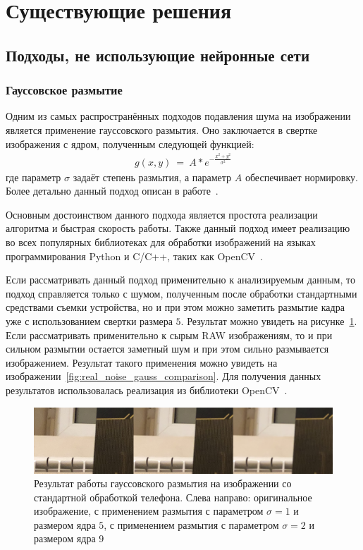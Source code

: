 \documentclass[14pt]{mmcs_article}
\begin{document}
\section{Существующие решения}
\subsection{Подходы, не использующие нейронные сети}

\subsubsection{Гауссовское размытие}
Одним из самых распространённых подходов подавления шума на изображении является применение гауссовского размытия. Оно заключается в свертке изображения с ядром, полученным следующей функцией:
\begin{eqnarray}\label{eq:gauss_kernel_function}
g(x, y)\ =\ A \ast e^{-\frac{x^2 + y^2}{\sigma^2}}
\end{eqnarray}
где параметр $\sigma$ задаёт степень размытия, а параметр $A$ обеспечивает нормировку. Более детально данный подход описан в работе~\autocite{GaussianBilinear}.

Основным достоинством данного подхода является простота реализации алгоритма и быстрая скорость работы. Также данный подход имеет реализацию во всех популярных библиотеках для обработки изображений на языках программирования Python и C/C++, таких как OpenCV~\autocite{OpenCVLib}.

Если рассматривать данный подход применительно к анализируемым данным, то подход справляется только с шумом, полученным после обработки стандартными средствами съемки устройства, но и при этом можно заметить размытие кадра уже с использованием свертки размера $5$. Результат можно увидеть на рисунке~\ref{fig:apple_noise_gauss_comparison}. Если рассматривать применительно к сырым RAW изображениям, то и при сильном размытии остается заметный шум и при этом сильно размывается изображением. Результат такого применения можно увидеть на изображении~\ref{fig:real_noise_gauss_comparison}. Для получения данных результатов использовалась реализация из библиотеки OpenCV~\autocite{OpenCVLib}.

\begin{figure}[H]
	\centering
	\includegraphics[width=\textwidth]{img/apple_noise_gaussian_params_comparison}
	\caption{Результат работы гауссовского размытия на изображении со стандартной обработкой телефона. Слева направо: оригинальное изображение, с применением размытия с параметром $\sigma = 1$ и размером ядра $5$, с применением размытия с параметром $\sigma = 2$ и размером ядра $9$}
	\label{fig:apple_noise_gauss_comparison}
\end{figure}
\end{document}
